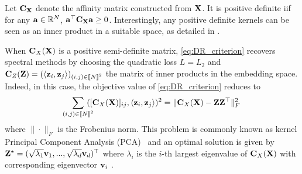 Let ${\mathbf{C}}_{{\mathbf{X}}}$ denote the affinity matrix constructed from ${\mathbf{X}}$. It is positive definite iif for any ${\mathbf{a}} \in \mathbb{R}^N$, ${\mathbf{a}}^\top {\mathbf{C}}_{{\mathbf{X}}} {\mathbf{a}} \geq 0$.
Interestingly, any positive definite kernels can be seen as an inner product in a suitable space, as detailed in .

When ${\mathbf{C}}_{X}({\mathbf{X}})$ is a positive semi-definite matrix, \cref{eq:DR_criterion}
recovers spectral methods by choosing the quadratic loss $L = L_2$ and ${\mathbf{C}}_{Z}({\mathbf{Z}}) = (\langle {\mathbf{z}}_i, {\mathbf{z}}_j \rangle)_{(i,j) \in {[\![N]\!]}^2}$ the matrix of inner
products in the embedding space. Indeed, in this case, the objective value of \cref{eq:DR_criterion}
reduces to
\begin{equation*}
\label{eq:spectral_method}
	\sum_{(i,j) \in {[\![N]\!]}^2} \!\!\!\!\! ([{\mathbf{C}}_{X}({\mathbf{X}})]_{ij}, \langle {\mathbf{z}}_i, {\mathbf{z}}_j \rangle)^2 = \| {\mathbf{C}}_{X}({\mathbf{X}}) - {\mathbf{Z}}{\mathbf{Z}}^\top \|^2_F\,
\end{equation*}
where $\|\cdot\|_F$ is the Frobenius norm. This problem is commonly known as kernel Principal Component Analysis (PCA)~\citep{scholkopf1997kernel}
 and an optimal solution is given by
${\mathbf{Z}}^\star = (\sqrt{\lambda_1} {\mathbf{v}}_{1}, ..., \sqrt{\lambda_d} {\mathbf{v}}_{d})^\top$ where $\lambda_i$ is the $i$-th
largest eigenvalue of ${\mathbf{C}}_{X}({\mathbf{X}})$ with corresponding eigenvector ${\mathbf{v}}_{i}$ 
\citep{eckart1936approximation}.

